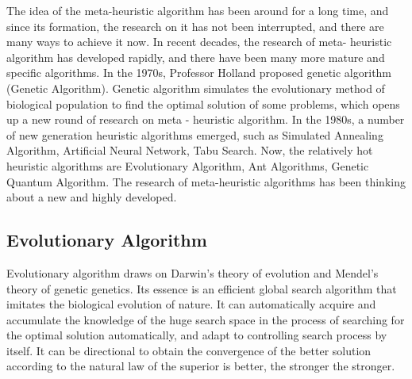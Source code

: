 The idea of the meta-heuristic algorithm has been around for a long time, and 
since its formation, the research on it has not been interrupted, and there 
are many ways to achieve it now. In recent decades, the research of meta-
heuristic algorithm has developed rapidly, and there have been many more 
mature and specific algorithms. In the 1970s, Professor Holland proposed 
genetic algorithm\cite{holland} (Genetic Algorithm). Genetic algorithm 
simulates the evolutionary method of biological population to find the 
optimal solution of some problems, which opens up a new round of research on 
meta - heuristic algorithm. In the 1980s, a number of new generation 
heuristic algorithms emerged, such as Simulated Annealing Algorithm, 
Artificial Neural Network, Tabu Search. Now, the relatively hot heuristic 
algorithms are Evolutionary Algorithm, Ant Algorithms, Genetic Quantum 
Algorithm. The research of meta-heuristic algorithms has been thinking about 
a new and highly developed\cite{harman}.

\subsection{Evolutionary Algorithm}
%

Evolutionary algorithm draws on Darwin's theory of evolution and Mendel's 
theory of genetic genetics. Its essence is an efficient global search 
algorithm that imitates the biological evolution of nature. It can 
automatically acquire and accumulate the knowledge of the huge search space 
in the process of searching for the optimal solution automatically, and adapt 
to controlling search process by itself. It can be directional to obtain the 
convergence of the better solution according to the natural law of the 
superior is better, the stronger the stronger\cite{deb}.

